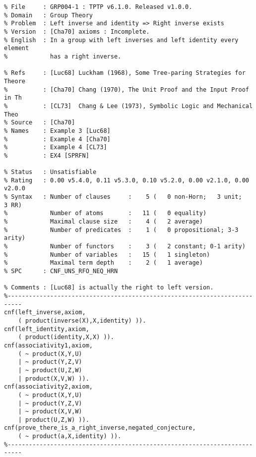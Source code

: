 	\begin{minipage}{\textwidth}
	\begin{lstlisting}[caption=GRP004-1.p problem,basicstyle=\footnotesize,breaklines=true,frame=single]
%--------------------------------------------------------------------------
% File     : GRP004-1 : TPTP v6.1.0. Released v1.0.0.
% Domain   : Group Theory
% Problem  : Left inverse and identity => Right inverse exists
% Version  : [Cha70] axioms : Incomplete.
% English  : In a group with left inverses and left identity every element
%            has a right inverse.

% Refs     : [Luc68] Luckham (1968), Some Tree-paring Strategies for Theore
%          : [Cha70] Chang (1970), The Unit Proof and the Input Proof in Th
%          : [CL73]  Chang & Lee (1973), Symbolic Logic and Mechanical Theo
% Source   : [Cha70]
% Names    : Example 3 [Luc68]
%          : Example 4 [Cha70]
%          : Example 4 [CL73]
%          : EX4 [SPRFN]

% Status   : Unsatisfiable
% Rating   : 0.00 v5.4.0, 0.11 v5.3.0, 0.10 v5.2.0, 0.00 v2.1.0, 0.00 v2.0.0
% Syntax   : Number of clauses     :    5 (   0 non-Horn;   3 unit;   3 RR)
%            Number of atoms       :   11 (   0 equality)
%            Maximal clause size   :    4 (   2 average)
%            Number of predicates  :    1 (   0 propositional; 3-3 arity)
%            Number of functors    :    3 (   2 constant; 0-1 arity)
%            Number of variables   :   15 (   1 singleton)
%            Maximal term depth    :    2 (   1 average)
% SPC      : CNF_UNS_RFO_NEQ_HRN

% Comments : [Luc68] is actually the right to left version.
%--------------------------------------------------------------------------
cnf(left_inverse,axiom,
    ( product(inverse(X),X,identity) )).
cnf(left_identity,axiom,
    ( product(identity,X,X) )).
cnf(associativity1,axiom,
    ( ~ product(X,Y,U)
    | ~ product(Y,Z,V)
    | ~ product(U,Z,W)
    | product(X,V,W) )).
cnf(associativity2,axiom,
    ( ~ product(X,Y,U)
    | ~ product(Y,Z,V)
    | ~ product(X,V,W)
    | product(U,Z,W) )).
cnf(prove_there_is_a_right_inverse,negated_conjecture,
    ( ~ product(a,X,identity) )).
%--------------------------------------------------------------------------
	\end{lstlisting}
	\end{minipage}




	